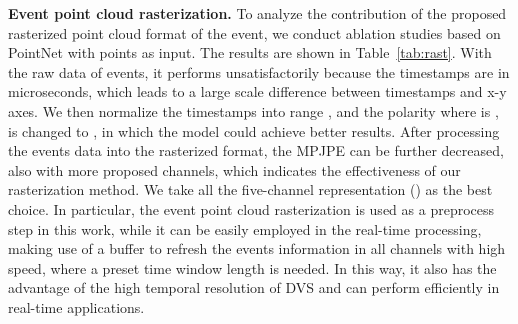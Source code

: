 \documentclass[10pt,twocolumn,letterpaper]{article}
\begin{document}
\begin{table}[t]
   \caption{\textbf{Event point cloud rasterization ablations.}}
   \label{tab:rast}
   \centering
   \renewcommand\arraystretch{1.54}{}
         \vspace{-1.5em}
\end{table}
\noindent\textbf{Event point cloud rasterization.}
To analyze the contribution of the proposed rasterized point cloud format of the event, we conduct ablation studies based on PointNet with  points as input.
The results are shown in Table~\ref{tab:rast}.
With the raw data of events, it performs unsatisfactorily because the timestamps are in microseconds, which leads to a large scale difference between timestamps and x-y axes.
We then normalize the timestamps into range , and the polarity where is , is changed to , in which the model could achieve better results.
After processing the events data into the rasterized format, the MPJPE can be further decreased, also with more proposed channels, which indicates the effectiveness of our rasterization method. We take all the five-channel representation () as the best choice.
In particular, the event point cloud rasterization is used as a preprocess step in this work, while it can be easily employed in the real-time processing, making use of a buffer to refresh the events information in all channels with high speed, where a preset time window length is needed.
In this way, it also has the advantage of the high temporal resolution of DVS and can perform efficiently in real-time applications.
\end{document}
